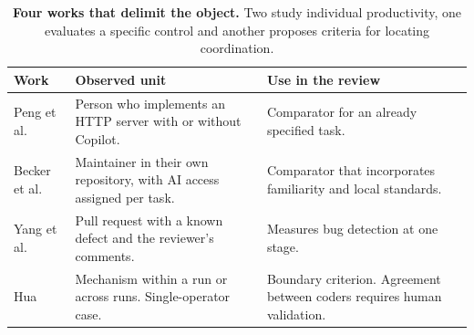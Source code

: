 \documentclass[11pt,a4paper]{article}
\newcommand{\hd}[1]{\textcolor{ink}{\bfseries #1}}
\begin{document}
\clearpage
\begin{table}[!ht]
\caption{\textbf{Four works that delimit the object.} Two study individual productivity, one evaluates a specific control and another proposes criteria for locating coordination.}\label{tab:comparadores}
\small\renewcommand{\arraystretch}{1.21}
\begin{tabularx}{\linewidth}{@{}L{2.7cm}YY@{}}
\toprule\hd{Work} & \hd{Observed unit} & \hd{Use in the review}\\\midrule
Peng et al. \citep{peng} & Person who implements an HTTP server with or without Copilot. & Comparator for an already specified task.\\
Becker et al. \citep{metr} & Maintainer in their own repository, with AI access assigned per task. & Comparator that incorporates familiarity and local standards.\\
Yang et al. \citep{review} & Pull request with a known defect and the reviewer's comments. & Measures bug detection at one stage.\\
Hua \citep{hua} & Mechanism within a run or across runs. Single-operator case. & Boundary criterion. Agreement between coders requires human validation.\\
\bottomrule\end{tabularx}
\end{table}
\end{document}

